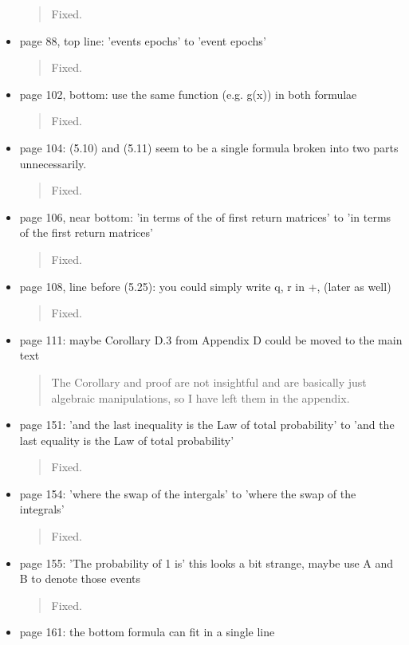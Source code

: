 \documentclass[a4paper]{article}
\begin{document}
\begin{itemize}
\begin{quote}
    Fixed. 
\end{quote}
\item {page 88, top line: 'events epochs' to 'event epochs'}
\begin{quote}
    Fixed. 
\end{quote}
\item {page 102, bottom: use the same function (e.g. g(x)) in both formulae}
\begin{quote}
    Fixed. 
\end{quote}
\item {page 104: (5.10) and (5.11) seem to be a single formula broken into two parts
unnecessarily.}
\begin{quote}
    Fixed. 
\end{quote}
\item {page 106, near bottom: 'in terms of the of first return matrices' to 'in terms of the
first return matrices'}
\begin{quote}
    Fixed. 
\end{quote}
\item {page 108, line before (5.25): you could simply write q, r in +, (later as well)}
\begin{quote}
    Fixed. 
\end{quote}
\item page 111: maybe Corollary D.3 from Appendix D could be moved to the main text
\begin{quote}
    The Corollary and proof are not insightful and are basically just algebraic manipulations, so I have left them in the appendix.
\end{quote}
\item {page 151: 'and the last inequality is the Law of total probability' to 'and the last
equality is the Law of total probability'}
\begin{quote}
    Fixed. 
\end{quote}
\item {page 154: 'where the swap of the intergals' to 'where the swap of the integrals'}
\begin{quote}
    Fixed. 
\end{quote}
\item {page 155: 'The probability of 1 is' this looks a bit strange, maybe use A and B to
denote those events}
\begin{quote}
    Fixed. 
\end{quote}
\item {page 161: the bottom formula can fit in a single line}

\end{itemize}
\end{document}
